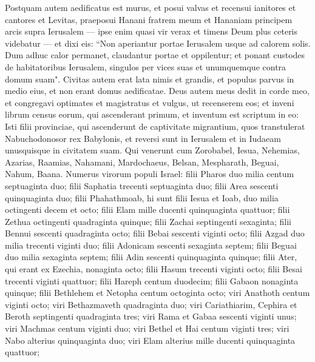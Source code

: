 \begin{biblechapter}  
\verse Postquam autem aedificatus est murus, et posui valvas et recensui ianitores et cantores et Levitas, 
\verse praeposui Hanani fratrem meum et Hananiam principem arcis supra Ierusalem — ipse enim quasi vir verax et timens Deum plus ceteris videbatur — 
\verse et dixi eis: “Non aperiantur portae Ierusalem usque ad calorem solis. Dum adhuc calor permanet, claudantur portae et oppilentur; et ponant custodes de habitatoribus Ierusalem, singulos per vices suas et unumquemque contra domum suam". 
\verse Civitas autem erat lata nimis et grandis, et populus parvus in medio eius, et non erant domus aedificatae. 
\verse Deus autem meus dedit in corde meo, et congregavi optimates et magistratus et vulgus, ut recenserem eos; et inveni librum census eorum, qui ascenderant primum, et inventum est scriptum in eo: 
\verse Isti filii provinciae, qui ascenderunt de captivitate migrantium, quos transtulerat Nabuchodonosor rex Babylonis, et reversi sunt in Ierusalem et in Iudaeam unusquisque in civitatem suam. 
\verse Qui venerunt cum Zorobabel, Iesua, Nehemias, Azarias, Raamias, Nahamani, Mardochaeus, Belsan, Mespharath, Beguai, Nahum, Baana. Numerus virorum populi Israel: 
\verse filii Pharos duo milia centum septuaginta duo; 
\verse filii Saphatia trecenti septuaginta duo; 
\verse filii Area sescenti quinquaginta duo; 
\verse filii Phahathmoab, hi sunt filii Iesua et Ioab, duo milia octingenti decem et octo; 
\verse filii Elam mille ducenti quinquaginta quattuor; 
\verse filii Zethua octingenti quadraginta quinque; 
\verse filii Zachai septingenti sexaginta; 
\verse filii Bennui sescenti quadraginta octo;  
\verse filii Bebai sescenti viginti octo; 
\verse filii Azgad duo milia trecenti viginti duo; 
\verse filii Adonicam sescenti sexaginta septem; 
\verse filii Beguai duo milia sexaginta septem; 
\verse filii Adin sescenti quinquaginta quinque; 
\verse filii Ater, qui erant ex Ezechia, nonaginta octo; 
\verse filii Hasum trecenti viginti octo; 
\verse filii Besai trecenti viginti quattuor;  
\verse filii Hareph centum duodecim; 
\verse filii Gabaon nonaginta quinque; 
\verse filii Bethlehem et Netopha centum octoginta octo; 
\verse viri Anathoth centum viginti octo; 
\verse viri Bethazmaveth quadraginta duo; 
\verse viri Cariathiarim, Cephira et Beroth septingenti quadraginta tres; 
\verse viri Rama et Gabaa sescenti viginti unus; 
\verse viri Machmas centum viginti duo; 
\verse viri Bethel et Hai centum viginti tres; 
\verse viri Nabo alterius quinquaginta duo; 
\verse viri Elam alterius mille ducenti quinquaginta quattuor; 

\end{biblechapter}
